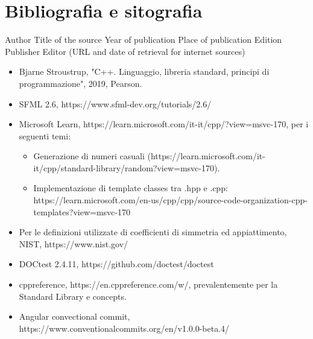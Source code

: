 \documentclass{article}
\begin{document}
\section{Bibliografia e sitografia}

Author
Title of the source
Year of publication
Place of publication
Edition
Publisher
Editor
(URL and date of retrieval for internet sources)
\begin{itemize}
    \item Bjarne Stroustrup, "C++. Linguaggio, libreria standard, principi di programmazione", 2019, Pearson.
    \item SFML 2.6, https://www.sfml-dev.org/tutorials/2.6/
    \item Microsoft Learn, https://learn.microsoft.com/it-it/cpp/?view=msvc-170, per i seguenti temi:
    \begin{itemize}
        \item Generazione di numeri casuali (https://learn.microsoft.com/it-it/cpp/standard-library/random?view=msvc-170).
        \item Implementazione di template classes tra .hpp e .cpp:
        https://learn.microsoft.com/en-us/cpp/cpp/source-code-organization-cpp-templates?view=msvc-170
    \end{itemize}
      \item Per le definizioni utilizzate di coefficienti di simmetria ed appiattimento, NIST, https://www.nist.gov/

      \item DOCtest 2.4.11, https://github.com/doctest/doctest
      \item cppreference, https://en.cppreference.com/w/, prevalentemente per la Standard Library e concepts.
      \item Angular convectional commit, https://www.conventionalcommits.org/en/v1.0.0-beta.4/   
\end{itemize}
\end{document}
